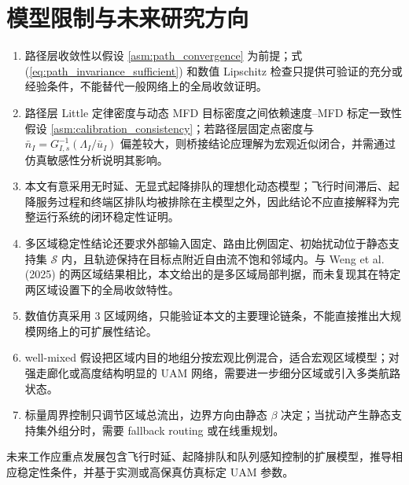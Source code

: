 \documentclass[a4paper,12pt]{article}
\theoremstyle{plain}
\theoremstyle{definition}
\theoremstyle{remark}
\begin{document}
\section{模型限制与未来研究方向}

\begin{enumerate}
    \item 路径层收敛性以假设 \ref{asm:path_convergence} 为前提；式 (\ref{eq:path_invariance_sufficient}) 和数值 Lipschitz 检查只提供可验证的充分或经验条件，不能替代一般网络上的全局收敛证明。
    \item 路径层 Little 定律密度与动态 MFD 目标密度之间依赖速度--MFD 标定一致性假设 \ref{asm:calibration_consistency}；若路径层固定点密度与 $\bar n_I=G_{I,s}^{-1}(\Lambda_I/\bar u_I)$ 偏差较大，则桥接结论应理解为宏观近似闭合，并需通过仿真敏感性分析说明其影响。
    \item 本文有意采用无时延、无显式起降排队的理想化动态模型；飞行时间滞后、起降服务过程和终端区排队均被排除在主模型之外，因此结论不应直接解释为完整运行系统的闭环稳定性证明。
    \item 多区域稳定性结论还要求外部输入固定、路由比例固定、初始扰动位于静态支持集 $\mathcal S$ 内，且轨迹保持在目标点附近自由流不饱和邻域内。与 Weng et al. (2025) 的两区域结果相比，本文给出的是多区域局部判据，而未复现其在特定两区域设置下的全局收敛特性。
    \item 数值仿真采用 3 区域网络，只能验证本文的主要理论链条，不能直接推出大规模网络上的可扩展性结论。
    \item well-mixed 假设把区域内目的地组分按宏观比例混合，适合宏观区域模型；对强走廊化或高度结构明显的 UAM 网络，需要进一步细分区域或引入多类航路状态。
    \item 标量周界控制只调节区域总流出，边界方向由静态 $\beta$ 决定；当扰动产生静态支持集外组分时，需要 fallback routing 或在线重规划。
\end{enumerate}

未来工作应重点发展包含飞行时延、起降排队和队列感知控制的扩展模型，推导相应稳定性条件，并基于实测或高保真仿真标定 UAM 参数。
\end{document}
